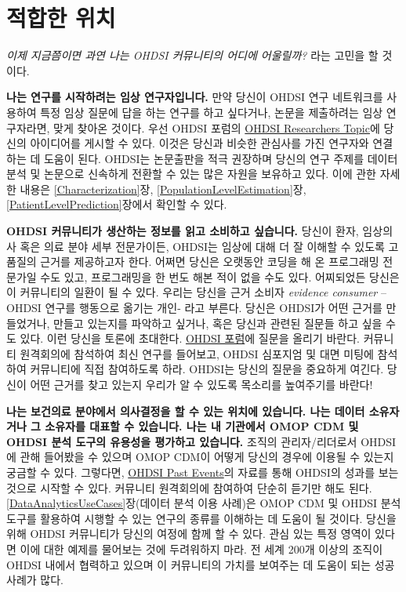 \documentclass[10.5pt]{book}
\theoremstyle{definition}
\theoremstyle{definition}
\theoremstyle{definition}
\theoremstyle{remark}
\begin{document}
\section{적합한 위치}\label{-}

\emph{이제 지금쯤이면 과연 나는 OHDSI 커뮤니티의 어디에 어울릴까?} 라는
고민을 할 것이다.

\textbf{나는 연구를 시작하려는 임상 연구자입니다.} 만약 당신이 OHDSI
연구 네트워크를 사용하여 특정 임상 질문에 답을 하는 연구를 하고
싶다거나, 논문을 제출하려는 임상 연구자라면, 맞게 찾아온 것이다. 우선
OHDSI 포럼의 \href{https://forums.ohdsi.org/c/researchers}{OHDSI
Researchers Topic}에 당신의 아이디어를 게시할 수 있다. 이것은 당신과
비슷한 관심사를 가진 연구자와 연결하는 데 도움이 된다. OHDSI는
논문출판을 적극 권장하며 당신의 연구 주제를 데이터 분석 및 논문으로
신속하게 전환할 수 있는 많은 자원을 보유하고 있다. 이에 관한 자세한
내용은 \ref{Characterization}장, \ref{PopulationLevelEstimation}장,
\ref{PatientLevelPrediction}장에서 확인할 수 있다.

\textbf{OHDSI 커뮤니티가 생산하는 정보를 읽고 소비하고 싶습니다.} 당신이
환자, 임상의사 혹은 의료 분야 세부 전문가이든, OHDSI는 임상에 대해 더 잘
이해할 수 있도록 고품질의 근거를 제공하고자 한다. 어쩌면 당신은 오랫동안
코딩을 해 온 프로그래밍 전문가일 수도 있고, 프로그래밍을 한 번도 해본
적이 없을 수도 있다. 어찌되었든 당신은 이 커뮤니티의 일환이 될 수 있다.
우리는 당신을 근거 소비자 \emph{evidence consumer} -- OHDSI 연구를
행동으로 옮기는 개인- 라고 부른다. 당신은 OHDSI가 어떤 근거를
만들었거나, 만들고 있는지를 파악하고 싶거나, 혹은 당신과 관련된 질문들
하고 싶을 수도 있다. 이런 당신을 토론에 초대한다.
\href{http://forum.ohdsi.org}{OHDSI 포럼}에 질문을 올리기 바란다.
커뮤니티 원격회의에 참석하여 최신 연구를 들어보고, OHDSI 심포지엄 및
대면 미팅에 참석하여 커뮤니티에 직접 참여하도록 하라. OHDSI는 당신의
질문을 중요하게 여긴다. 당신이 어떤 근거를 찾고 있는지 우리가 알 수
있도록 목소리를 높여주기를 바란다!

\textbf{나는 보건의료 분야에서 의사결정을 할 수 있는 위치에 있습니다.
나는 데이터 소유자거나 그 소유자를 대표할 수 있습니다. 나는 내 기관에서
OMOP CDM 및 OHDSI 분석 도구의 유용성을 평가하고 있습니다.} 조직의
관리자/리더로서 OHDSI에 관해 들어봤을 수 있으며 OMOP CDM이 어떻게 당신의
경우에 이용될 수 있는지 궁금할 수 있다. 그렇다면,
\href{https://www.ohdsi.org/past-events/}{OHDSI Past Events}의 자료를
통해 OHDSI의 성과를 보는 것으로 시작할 수 있다. 커뮤니티 원격회의에
참여하여 단순히 듣기만 해도 된다. \ref{DataAnalyticsUseCases}장(데이터
분석 이용 사례)은 OMOP CDM 및 OHDSI 분석 도구를 활용하여 시행할 수 있는
연구의 종류를 이해하는 데 도움이 될 것이다. 당신을 위해 OHDSI 커뮤니티가
당신의 여정에 함께 할 수 있다. 관심 있는 특정 영역이 있다면 이에 대한
예제를 물어보는 것에 두려워하지 마라. 전 세계 200개 이상의 조직이 OHDSI
내에서 협력하고 있으며 이 커뮤니티의 가치를 보여주는 데 도움이 되는 성공
사례가 많다.
\end{document}
